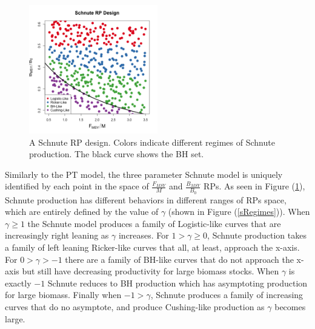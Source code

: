 \documentclass[12pt]{article}
\begin{document}

%
\begin{figure}
\vspace{-0.5cm}
\includegraphics[width=0.5\textwidth]{../gpBias/designLineColorHHardFlatT30N150WWideN112.png}
\vspace{-1cm}
\caption{
A Schnute RP design. %
Colors indicate different regimes of Schnute production. %
The black curve shows the BH set.
}
\label{colorDes}
\end{figure}

%
Similarly to the PT model, the three parameter Schnute model is uniquely 
identified by each point in the space of $\frac{F_{MSY}}{M}$ 
and $\frac{B_{MSY}}{B_0}$ RPs. As seen in Figure (\ref{colorDes}), Schnute 
production has different behaviors in different ranges of RPs space, which 
are entirely defined by the value of $\gamma$ (shown in Figure (\ref{sRegimes})). 
When $\gamma\ge1$ the Schnute model produces a family of Logistic-like curves that are 
increasingly right leaning as $\gamma$ increases. 
For $1>\gamma\ge0$, Schnute production takes a family of left leaning Ricker-like curves 
that all, at least, approach the x-axis. For $0>\gamma>-1$ there are a family of BH-like 
curves that do not approach the x-axis but still have decreasing productivity for large
biomass stocks. When $\gamma$ is exactly $-1$ Schnute reduces to BH production which has 
asymptoting production for large biomass. Finally when $-1>\gamma$, Schnute 
produces a family of increasing curves that do no asymptote, and produce 
Cushing-like production as $\gamma$ becomes large.
\end{document}
